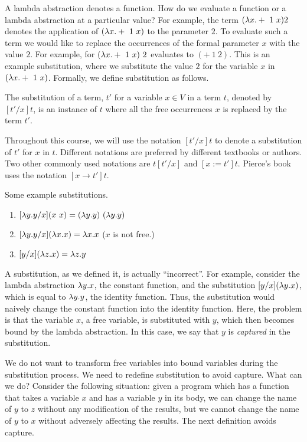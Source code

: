 A lambda abstraction denotes a function.  How do we evaluate a
function or a lambda abstraction at a particular value?  For example,
the term $(\lambda x.+~1~x)2$ denotes the application of $(\lambda x.+~1~x)$ to
the parameter $2$.  To evaluate such a term we would like to replace
the occurrences of the formal parameter $x$ with the value $2$.  For
example, for $(\lambda x.+~1~x)~2$ evaluates to $(+~1~2)$.  This is an
example substitution, where we substitute the value $2$ for the
variable $x$ in $(\lambda x.+~1~x)$.  Formally, we define substitution as
follows.

\begin{definition}
The substitution of a term, $t'$ for a variable $x \in V$ in a term
$t$, denoted by $[t'/x]t$, is an instance of $t$ where all the free
occurrences $x$ is replaced by the term $t'$.
\end{definition}

Throughout this course, we will use the notation $[t'/x]t$ to denote a
substitution of $t'$ for $x$ in $t$.  Different notations are
preferred by different textbooks or authors. Two other commonly used
notations are $t[t'/x]$ and $[x:=t']t$.  Pierce's book uses the
notation $[x \rightarrow t']t$.


\begin{example}
Some example substitutions.
\begin{enumerate}
\item $[\lambda y.y/x] (x~x)= (\lambda y.y)~(\lambda y.y)$

\item $[\lambda y.y/x] (\lambda x.x) = \lambda x.x$ ($x$ is not free.)

\item $[y/x](\lambda z.x) = \lambda z.y$

\end{enumerate}
\end{example}

A substitution, as we defined it, is actually ``incorrect''.  For
example, consider the lambda abstraction $\lambda y.x$, the constant
function, and the substitution $[y/x](\lambda y.x)$, which is equal to $\lambda
y.y$, the identity function.  Thus, the substitution would naively
change the constant function into the identity function.  Here, the
problem is that the variable $x$, a free variable, is substituted with
$y$, which then becomes bound by the lambda abstraction.  In this
case, we say that $y$ is \emph{captured} in the substitution.

We do not want to transform free variables into bound variables during
the substitution process.  We need to redefine substitution to avoid
capture. What can we do?  Consider the following situation: given a
program which has a function that takes a variable $x$ and has a
variable $y$ in its body, we can change the name of $y$ to $z$ without
any modification of the results, but we cannot change the name of $y$
to $x$ without adversely affecting the results. The next definition
avoids capture.
 
